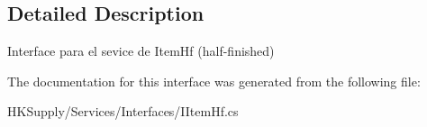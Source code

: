 \subsection{Detailed Description}
Interface para el sevice de Item\+Hf (half-\/finished) 



The documentation for this interface was generated from the following file\+:\begin{DoxyCompactItemize}
\item 
H\+K\+Supply/\+Services/\+Interfaces/I\+Item\+Hf.\+cs\end{DoxyCompactItemize}
